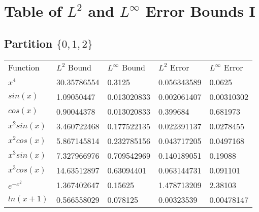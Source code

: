 

%
\chapter*{\thechapter \quad Table of $L^2$ and $L^{\infty}$ Error Bounds I}
\label{appendixC}

\section{Partition $\{0,1,2\}$}
\begin{tabular}{lllll}
Function    & $L^2$ Bound & $L^{\infty}$ Bound & $L^2$ Error      & $L^{\infty}$ Error \\
%
$x^4$       & 30.35786554 & 0.3125             & 0.056343589 & 0.0625       \\
$sin(x)$    & 1.09050447  & 0.013020833        & 0.002061407 & 0.00310302   \\
$cos(x)$    & 0.90044378  & 0.013020833        & 0.399684    & 0.681973     \\
$x^2sin(x)$ & 3.460722468 & 0.177522135        & 0.022391137 & 0.0278455    \\
$x^2cos(x)$ & 5.867145814 & 0.232785156        & 0.043717205 & 0.0497168    \\
$x^3sin(x)$ & 7.327966976 & 0.709542969        & 0.140189051 & 0.19088      \\
$x^3cos(x)$ & 14.63512897 & 0.63094401         & 0.063144731 & 0.091101     \\
$e^{-x^2}$  & 1.367402647 & 0.15625            & 1.478713209 & 2.38103      \\
$ln(x+1)$   & 0.566558029 & 0.078125           & 0.00323539  & 0.00478147  
\end{tabular}

